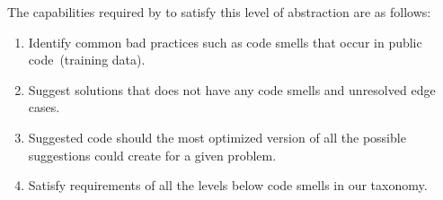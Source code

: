 The capabilities required by \cct{} to satisfy this level of abstraction are as follows:
\begin{enumerate}
    \item Identify common bad practices such as code smells that occur in public code~(training data).
    \item Suggest solutions that does not have any code smells and unresolved edge cases.
    \item Suggested code should the most optimized version of all the possible suggestions \cct{} could create for a given problem.
    \item Satisfy requirements of all the levels below code smells in our taxonomy.
\end{enumerate}

